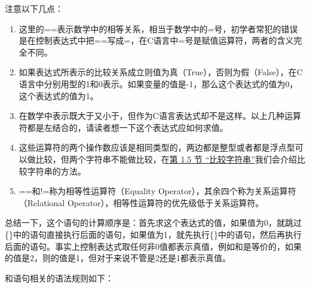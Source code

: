 注意以下几点：


\begin{enumerate}

\item 这里的==表示数学中的相等关系，相当于数学中的=号，初学者常犯的错误是在控制表达式中把==写成=，在C语言中=号是赋值运算符，两者的含义完全不同。

\item 如果表达式所表示的比较关系成立则值为真（True），否则为假（False），在C语言中分别用型的1和0表示。如果变量的值是-1，那么这个表达式的值为0，这个表达式的值为1。

\item 在数学中表示既大于又小于，但作为C语言表达式却不是这样。以上几种运算符都是左结合的，请读者想一下这个表达式应如何求值。

\item 这些运算符的两个操作数应该是相同类型的，两边都是整型或者都是浮点型可以做比较，但两个字符串不能做比较，在\hyperlink{db.ch25s01.id2828656}{第 1.\BookSplit{}5 节 “比较字符串”}我们会介绍比较字符串的方法。

\item ==和!=称为相等性运算符（Equality Operator），其余四个称为关系运算符（Relational Operator），相等性运算符的优先级低于关系运算符。
\end{enumerate}


总结一下，这个语句的计算顺序是：首先求这个表达式的值，如果值为0，就跳过\{\}中的语句直接执行后面的语句，如果值为1，就先执行\{\}中的语句，然后再执行后面的语句。事实上控制表达式取任何非0值都表示真值，例如和是等价的，如果的值是2，则的值是1，但对于来说不管是2还是1都表示真值。



和语句相关的语法规则如下：


\begin{BookLiteral}
\end{BookLiteral}


